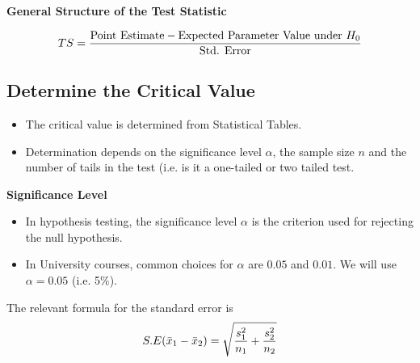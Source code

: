 \documentclass[a4paper,12pt]{article}
\begin{document}
\noindent \textbf{General Structure of the Test Statistic}
\begin{framed}
\[ TS = {\mbox{Point Estimate} - \mbox{Expected Parameter Value under $H_{0}$} \over \mbox{Std. Error}}\]
\end{framed}
\newpage 
\subsection*{Determine the Critical Value}

\begin{itemize}
\item The critical value is determined from Statistical Tables.
\item Determination depends on the significance level $\alpha$, the sample size $n$ and the number of tails in the test (i.e. is it a one-tailed or two tailed test.
\end{itemize}

\noindent \textbf{Significance Level}

\begin{itemize}
\item In hypothesis testing, the significance level $\alpha$ is the criterion used for rejecting the null hypothesis. 

\item In University courses, common choices for $\alpha$ are $0.05$ and $0.01$. We will use $\alpha =0.05$ (i.e. 5\%).
\end{itemize}


\item The relevant formula for the standard error is
\[ S.E(\bar{x}_1 - \bar{x}_2) = \sqrt{{s^2_1\over n_1}+{s^2_2 \over n_2}} \]
\end{document}
